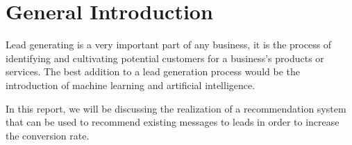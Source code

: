 \thispagestyle{plain} %
\section*{General Introduction}

Lead generating is a very important part of any business, it is the process of identifying and cultivating potential customers for a business's products or services.
The best addition to a lead generation process would be the introduction of machine learning and artificial intelligence.

In this report, we will be discussing the realization of a recommendation system that can be used to recommend existing messages to leads in order to increase the conversion rate.

\newpage
